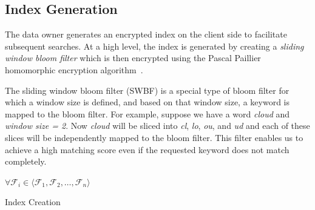 \subsection{Index Generation}

The data owner generates an encrypted index on the client side to facilitate
subsequent searches. At a high level, the index is generated by creating a 
\textit{sliding window bloom filter} which is then encrypted using the Pascal Paillier
homomorphic encryption algorithm~\cite{pascal}. 

The sliding window bloom filter (SWBF) is a special type of bloom filter
for which a window size is defined, and based on that
window size, a keyword is mapped to the bloom filter. For example, suppose we have a word
\emph{cloud} and \emph {window size = 2}. Now \emph{cloud} will be sliced into
\emph{cl}, \emph{lo}, \emph{ou}, and \emph{ud} and each of these slices will be 
independently mapped to the bloom filter. This filter enables us to achieve
 a high matching score even if the requested keyword does not match completely.

\begin{algorithm}[b!]
$ \forall \mathcal{F}_i \in \langle \mathcal{F}_1, \mathcal{F}_2, \ldots,
\mathcal{F}_n \rangle$\;
\;
 \caption{Index Creation}
 \label{algo:IndexCreation}
\end{algorithm}

